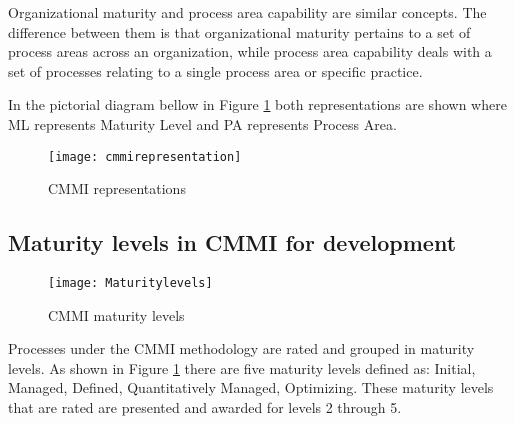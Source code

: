 Organizational maturity and process area capability are similar concepts. The difference between them is that organizational maturity pertains to a set of process areas across an organization, while process area capability deals with a set of processes relating to a single process area or specific practice.

In the pictorial diagram bellow in Figure \ref{fig:cmmirepresentation} both representations are shown where ML represents Maturity Level and PA represents Process Area.

\begin{figure}[h]
	\begin{center}
		\leavevmode
		\texttt{[image: cmmirepresentation]}
		\caption{CMMI representations}
		\label{fig:cmmirepresentation}
	\end{center}
\end{figure}

\subsection{Maturity levels in CMMI for development}
\begin{figure}[h]
	\begin{center}
		\leavevmode
		\texttt{[image: Maturitylevels]}
		\caption{CMMI maturity levels}
		\label{fig:maturitylevels}
	\end{center}
\end{figure}
Processes under the CMMI methodology are rated and grouped in maturity levels. As shown in Figure \ref{fig:cmmirepresentation} there are five  maturity levels defined as: Initial, Managed, Defined, Quantitatively Managed, Optimizing. These maturity levels that are rated are presented and awarded for levels 2 through 5.


